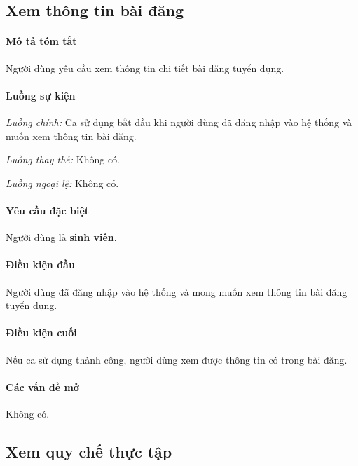 \documentclass[./../main.tex]{subfiles}
\begin{document}
\subsection{Xem thông tin bài đăng}

\paragraph*{Mô tả tóm tắt}

Người dùng yêu cầu xem thông tin chi tiết bài đăng tuyển dụng.

\paragraph*{Luồng sự kiện}

\emph{Luồng chính:} Ca sử dụng bắt đầu khi người dùng đã đăng nhập vào
hệ thống và muốn xem thông tin bài đăng.

\emph{Luồng thay thế:} Không có.

\emph{Luồng ngoại lệ:} Không có.

\paragraph*{Yêu cầu đặc biệt}

Người dùng là \textbf{sinh viên}.

\paragraph*{Điều kiện đầu}

Người dùng đã đăng nhập vào hệ thống và mong muốn xem thông tin bài đăng
tuyển dụng.

\paragraph*{Điều kiện cuối}

Nếu ca sử dụng thành công, người dùng xem được thông tin có trong bài
đăng.

\paragraph*{Các vấn đề mở}

Không có.

\subsection{Xem quy chế thực tập}
\end{document}
